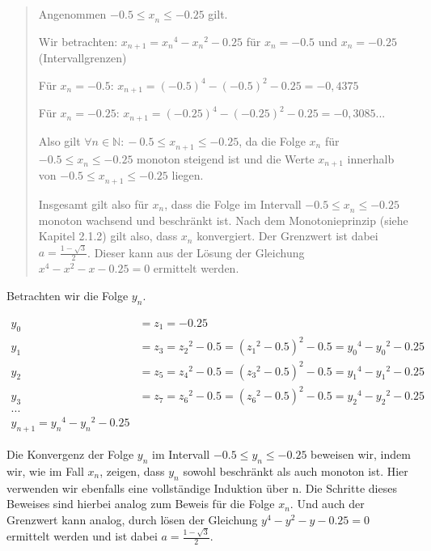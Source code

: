 \documentclass[a4paper, 12pt]{book}
\begin{document}
\begin{quote}
Angenommen \(- 0.5{\leq x}_{n} \leq  - 0.25\) gilt.

Wir betrachten:
\(x_{n + 1} = {x_{n}}^{4} - {x_{n}}^{2} - 0.25\) für
\(x_{n} =  - 0.5\) und \(x_{n} =  - 0.25\) (Intervallgrenzen)

Für \(x_{n} =  - 0.5\):
\(x_{n + 1} = {( - 0.5)}^{4} - {( - 0.5)}^{2} - 0.25 =  - 0,4375\)

Für \(x_{n} =  - 0.25\):
\(x_{n + 1} = {( - 0.25)}^{4} - {( - 0.25)}^{2} - 0.25 =  - 0,3085...\)

Also gilt
\(\forall n \in \mathbb{N:} - 0.5{\leq x}_{n + 1} \leq  - 0.25\),
da die Folge \(x_{n}\) für
\(- 0.5{\leq x}_{n} \leq  - 0.25\) monoton steigend ist und
die Werte \({x}_{n + 1}\) innerhalb von
\(- 0.5{\leq x}_{n + 1} \leq  - 0.25\) liegen.

Insgesamt gilt also für \(x_{n}\), dass die Folge im Intervall
\(- 0.5{\leq x}_{n} \leq  - 0.25\) monoton wachsend und
beschränkt ist. Nach dem Monotonieprinzip (siehe Kapitel 2.1.2) gilt
also, dass \(x_{n}\) konvergiert. Der Grenzwert ist dabei
\(a = \frac{1 - \sqrt{3}}{2}\). Dieser kann aus der Lösung der
Gleichung \(x^{4} - x^{2} - x - 0.25 = 0\) ermittelt
werden.
\end{quote}

Betrachten wir die Folge \(y_{n}\).

\begin{align*}
y_{0} &= z_{1} =  - 0.25\\
y_{1} &= z_{3} = {z_{2}}^{2} - 0.5 = ({z_{1}}^{2} - 0.5)^{2} - 0.5 = {y_{0}}^{4} - {y_{0}}^{2} - 0.25\\
y_{2} &= z_{5} = {z_{4}}^{2} - 0.5 = ({z_{3}}^{2} - 0.5)^{2} - 0.5 = {y_{1}}^{4} - {y_{1}}^{2} - 0.25\\
y_{3} &= z_{7} = {z_{6}}^{2} - 0.5 = ({z_{6}}^{2} - 0.5)^{2} - 0.5 = {y_{2}}^{4} - {y_{2}}^{2} - 0.25\\
...\\
y_{n + 1} = {y_{n}}^{4} - {y_{n}}^{2} - 0.25
\end{align*}

Die Konvergenz der Folge \(y_{n}\) im Intervall
\(- 0.5{\leq y}_{n} \leq  - 0.25\) beweisen wir, indem wir,
wie im Fall \(x_{n}\), zeigen, dass \(y_{n}\) sowohl beschränkt als auch
monoton ist. Hier verwenden wir ebenfalls eine vollständige Induktion
über n. Die Schritte dieses Beweises sind hierbei analog zum Beweis für
die Folge \(x_{n}\). Und auch der Grenzwert kann analog, durch lösen der
Gleichung \(y^{4} - y^{2} - y - 0.25 = 0\) ermittelt
werden und ist dabei \(a = \frac{1 - \sqrt{3}}{2}\).
\end{document}
